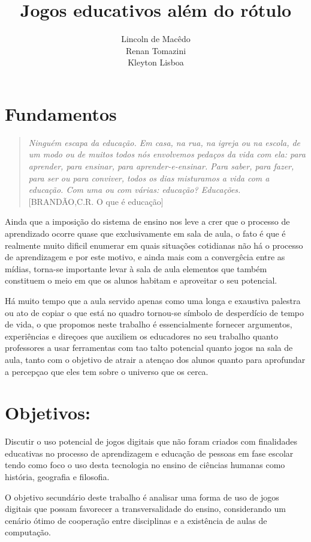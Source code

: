 \documentclass[10pt,a4paper]{article}
\author{Lincoln de Macêdo\\
		Renan Tomazini\\
		Kleyton Lisboa}
\title{Jogos educativos além do rótulo}
\begin{document}
	
	\maketitle
	
	\section*{Fundamentos}
	
	\begin{quotation}
		\textit{Ninguém escapa da educação. Em casa, na rua, na igreja ou na escola, de um modo ou de muitos todos nós envolvemos pedaços da vida com ela: para aprender, para ensinar, para aprender-e-ensinar. Para saber, para fazer, para ser ou para conviver, todos os dias misturamos a vida com a educação. Com uma ou com várias: educação? Educações.} [BRANDÃO,C.R. O que é educação]
	\end{quotation}
	
	Ainda que a imposição do sistema de ensino nos leve a crer que o processo de aprendizado ocorre quase que exclusivamente em sala de aula, o fato é que é realmente muito dificil enumerar em quais situações cotidianas não há o processo de aprendizagem e por este motivo, e ainda mais com a convergêcia entre as mídias, torna-se importante levar à sala de aula elementos que também constituem o meio em que os alunos habitam e aproveitar o seu potencial.
	
	Há muito tempo que a aula servido apenas como uma longa e exaustiva palestra ou ato de copiar o que está no quadro tornou-se símbolo de desperdício de tempo de vida, o que propomos neste trabalho é essencialmente fornecer argumentos, experiências e direçoes que auxiliem os educadores no seu trabalho quanto professores a usar ferramentas com tao talto potencial quanto jogos na sala de aula, tanto com o objetivo de atrair a atençao dos alunos quanto para aprofundar a percepçao que eles tem sobre o universo que os cerca.
	
	\section*{Objetivos:}
	Discutir o uso potencial de jogos digitais que não foram criados com finalidades educativas no processo de aprendizagem e educação de pessoas em fase escolar tendo como foco o uso desta tecnologia no ensino de ciências humanas como história, geografia e filosofia.
	
	O objetivo secundário deste trabalho é analisar uma forma de uso de jogos digitais que possam favorecer a transversalidade do ensino, considerando um cenário ótimo de cooperação entre disciplinas e a existência de aulas de computação.
	
\end{document}
